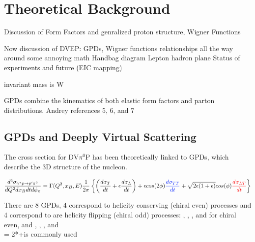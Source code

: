 
\section{Theoretical Background}
    Discussion of Form Factors and genralized proton structure, Wigner Functions

    Now discussion of DVEP:
GPDs, Wigner functions
relationships all the way around
some annoying math
Handbag diagram
Lepton hadron plane
Status of experiments and future (EIC mapping)


invariant mass is W 

GPDs combine the kinematics of both elastic form factors and parton distributions. Andrey references 5, 6, and 7


    \subsection{GPDs and Deeply Virtual Scattering}

          The cross section for DV$\pi^0$P has been theoretically linked to GPDs, which describe the 3D structure of the nucleon.

    
     \begin{equation}\label{DVPiPXCrossSection}
           \frac{d^4\sigma_{\gamma^*p \rightarrow p'\pi^0}}{dQ^2dx_Bdtd\phi_{\pi}} =
         \Gamma (Q^2, x_B, E)
         \frac{1}{2\pi}
         \left\{ \left(  \textcolor{sigmaT}{\frac{d\sigma_T}{dt}}+\epsilon  \textcolor{sigmaL}{\frac{d\sigma_L}{dt}} \right)+
         \epsilon cos(2\phi)  \textcolor{sigmaTT}{\frac{d\sigma_{TT}}{dt}} + 
         \sqrt{2\epsilon(1+\epsilon)} cos(\phi)  \textcolor{sigmaLT}{\frac{d\sigma_{LT}}{dt}} \right\}
     \end{equation}      
    
     
    There are 8 GPDs, 4 correspond to helicity conserving (chiral even) processes and 4 correspond to are helicity flipping (chiral odd) processes: \GPDH,  \GPDE,  \GPDHtilde,  and \GPDEtilde  \quad for chiral even, and \GPDHT,  \GPDET,  \GPDHTtilde, and \GPDETtilde \\
\GPDETbar = 2*\GPDHTtilde+\GPDET is commonly used

